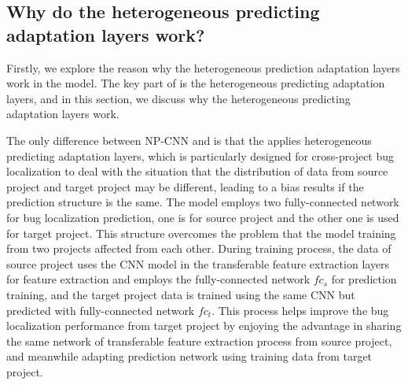 \subsection{Why do the heterogeneous predicting adaptation layers work? }
Firstly, we explore the reason why the heterogeneous prediction adaptation layers work in the \TRANPCNN model. The key part of \TRANPCNN is the heterogeneous predicting adaptation layers, and in this section, we discuss why the heterogeneous predicting adaptation layers work. 

The only difference between NP-CNN and \TRANPCNN is that the \TRANPCNN applies heterogeneous predicting adaptation layers, which is particularly designed for cross-project bug localization to deal with the situation that the distribution of data from source project and target project may be different, leading to a bias results if the prediction structure is the same. The \TRANPCNN model employs two fully-connected network for bug localization prediction, one is for source project and the other one is used for target project. This structure overcomes the problem that the model training from two projects affected from each other. During training process, the data of source project uses the CNN model in the transferable feature extraction layers  for feature extraction and employs the fully-connected network $fc_s$ for prediction training, and the target project data is trained using the same CNN but predicted with fully-connected network $fc_t$. This process helps improve the bug localization performance from target project by enjoying the advantage in sharing the same network of transferable feature extraction process from source project, and meanwhile adapting prediction network using training data from target project. 


